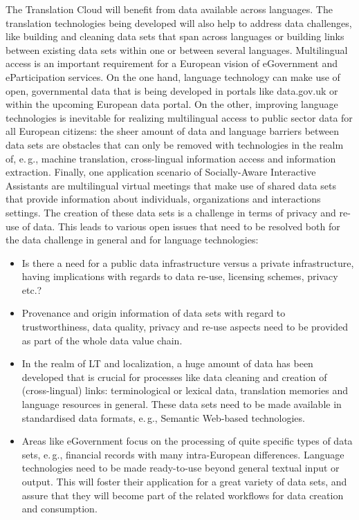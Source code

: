 \documentclass[10pt, plain]{../../metanetpaper}
\begin{document}
\begin{multicols}{2}
The Translation Cloud will benefit from data available across languages. The translation technologies being developed will also help to address data challenges, like building and cleaning data sets that span across languages or building links between existing data sets within one or between several languages. Multilingual access is an important requirement for a European vision of eGovernment and eParticipation services. On the one hand, language technology can make use of open, governmental data that is being developed in portals like data.gov.uk or within the upcoming European data portal. On the other, improving language technologies is inevitable for realizing multilingual access to public sector data for all European citizens: the sheer amount of data and language barriers between data sets are obstacles that can only be removed with technologies in the realm of, e.\,g., machine translation, cross-lingual information access and information extraction. Finally, one application scenario of Socially-Aware Interactive Assistants are multilingual virtual meetings that make use of shared data sets that provide information about individuals, organizations and interactions settings. The creation of these data sets is a challenge in terms of privacy and re-use of data. This leads to various open issues that need to be resolved both for the data challenge in general and for language technologies:

\begin{itemize}
\item Is there a need for a public data infrastructure versus a private infrastructure, having implications with regards to data re-use, licensing schemes, privacy etc.?
\item Provenance and origin information of data sets with regard to trustworthiness, data quality, privacy and re-use aspects need to be provided as part of the whole data value chain.
\item In the realm of LT and localization, a huge amount of data has been developed that is crucial for processes like data cleaning and creation of (cross-lingual) links: terminological or lexical data, translation memories and language resources in general. These data sets need to be made available in standardised data formats, e.\,g., Semantic Web-based technologies.
\item Areas like eGovernment focus on the processing of quite specific types of data sets, e.\,g., financial records with many intra-European differences. Language technologies need to be made ready-to-use beyond general textual input or output. This will foster their application for a great variety of data sets, and assure that they will become part of the related workflows for data creation and consumption.
\end{itemize}


\end{multicols}
\end{document}
